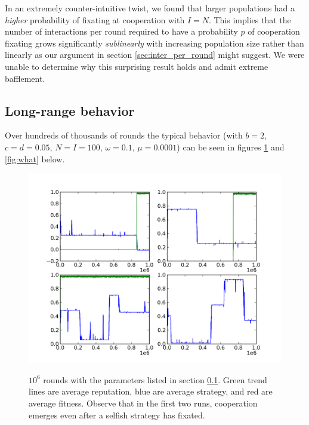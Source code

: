 \documentclass{amsart}
\begin{document}
In an extremely counter-intuitive twist, we found that larger
populations had a \emph{higher} probability of fixating at cooperation
with $I=N$. This implies that the number of interactions per round
required to have a probability $p$ of cooperation fixating grows
significantly \emph{sublinearly} with increasing population size
rather than linearly as our argument in section
\ref{sec:inter_per_round} might suggest. We were unable to determine why
this surprising result holds and admit extreme bafflement.

\subsection{Long-range behavior}
\label{sec:longrange}
Over hundreds of thousands of rounds the typical behavior (with $b=2$,
$c = d = 0.05$, $N = I = 100$, $\omega = 0.1$, $\mu = 0.0001$) can be
seen in figures \ref{fig:really} and \ref{fig:what} below.

\begin{figure}[h]
\caption{$10^6$ rounds with the parameters listed in section
  \ref{sec:longrange}. Green trend lines are average reputation, blue
  are average strategy, and red are average fitness. Observe that in
  the first two runs, cooperation emerges even after a selfish
  strategy has fixated.}

\includegraphics[width=\textwidth]{really.png}
\label{fig:really}
\end{figure}
\end{document}
